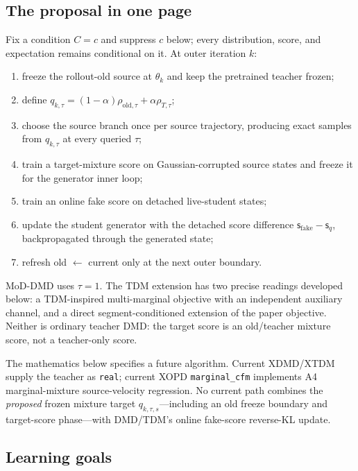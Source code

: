\documentclass[11pt,a4paper]{article}
\newcommand{\old}{\mathrm{old}}
\newcommand{\fake}{\mathrm{fake}}
\newcommand{\score}{\mathsf{s}}
\theoremstyle{plain}
\theoremstyle{definition}
\begin{document}
\subsection{The proposal in one page}

Fix a condition $C=c$ and suppress $c$ below; every distribution, score, and expectation remains
conditional on it.  At outer iteration $k$:
\begin{enumerate}[leftmargin=1.6em]
\item freeze the rollout-old source at $\theta_k$ and keep the pretrained teacher frozen;
\item define $q_{k,\tau}=(1-\alpha)\rho_{\old,\tau}+\alpha\rho_{T,\tau}$;
\item choose the source branch once per source trajectory, producing exact samples from
      $q_{k,\tau}$ at every queried $\tau$;
\item train a target-mixture score on Gaussian-corrupted source states and freeze it for the
      generator inner loop;
\item train an online fake score on detached live-student states;
\item update the student generator with the detached score difference
      $\score_{\fake}-\score_q$, backpropagated through the generated state;
\item refresh old $\leftarrow$ current only at the next outer boundary.
\end{enumerate}

MoD-DMD uses $\tau=1$.  The TDM extension has two precise readings developed below:
a TDM-inspired multi-marginal objective with an independent auxiliary channel, and a direct
segment-conditioned extension of the paper objective.  Neither is ordinary teacher DMD: the
target score is an old/teacher mixture score, not a teacher-only score.

\begin{tcolorbox}[
  colback=yellow!5,
  colframe=yellow!45!black,
  title=Status boundary]
The mathematics below specifies a future algorithm.  Current XDMD/XTDM supply the teacher as
\texttt{real}; current XOPD \texttt{marginal\_cfm} implements A4 marginal-mixture
source-velocity regression.  No current path combines the \emph{proposed} frozen mixture target
$q_{k,\tau,s}$---including an old freeze boundary and target-score phase---with DMD/TDM's online
fake-score reverse-KL update.
\end{tcolorbox}

\subsection{Learning goals}
\end{document}
